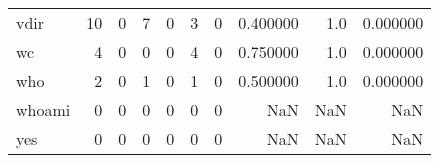 \begin{tabular}{lrrrrrrrrr}
vdir      &                                                 10 &                                                  0 &                                                  7 &                                                  0 &                                                  3 &                                                  0 &                                           0.400000 &                                    1.0 &                             0.000000 \\
wc        &                                                  4 &                                                  0 &                                                  0 &                                                  0 &                                                  4 &                                                  0 &                                           0.750000 &                                    1.0 &                             0.000000 \\
who       &                                                  2 &                                                  0 &                                                  1 &                                                  0 &                                                  1 &                                                  0 &                                           0.500000 &                                    1.0 &                             0.000000 \\
whoami    &                                                  0 &                                                  0 &                                                  0 &                                                  0 &                                                  0 &                                                  0 &                                                NaN &                                    NaN &                                  NaN \\
yes       &                                                  0 &                                                  0 &                                                  0 &                                                  0 &                                                  0 &                                                  0 &                                                NaN &                                    NaN &                                  NaN \\
\bottomrule
\end{tabular}
